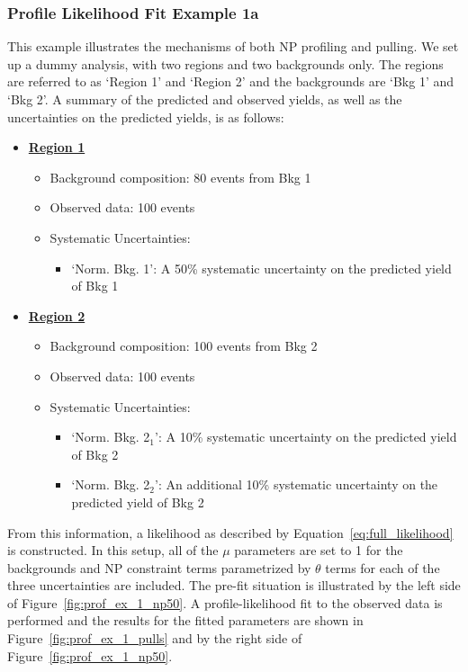 \subsubsection{Profile Likelihood Fit Example 1a}
\label{sec:profiling_example_1a}

This example illustrates the mechanisms of both NP profiling and pulling.
We set up a dummy analysis, with two regions and two backgrounds only.
The regions are referred to as `Region 1' and `Region 2' and the backgrounds
are `Bkg 1' and `Bkg 2'.
A summary of the predicted and observed yields, as well as the uncertainties on
the predicted yields, is as follows:

\begin{itemize}
    \item \underline{\textbf{Region 1}}
        \begin{itemize}
            \item Background composition: 80 events from Bkg 1
            \item Observed data: 100 events
            \item Systematic Uncertainties:
            \begin{itemize}
                \item `Norm. Bkg. 1': A 50\% systematic uncertainty on the predicted yield of Bkg 1
            \end{itemize}
        \end{itemize}
    \item \underline{\textbf{Region 2}}
        \begin{itemize}
            \item Background composition: 100 events from Bkg 2
            \item Observed data: 100 events
            \item Systematic Uncertainties:
            \begin{itemize}
                \item `Norm. Bkg. 2$_1$': A 10\% systematic uncertainty on the predicted yield of Bkg 2
                \item `Norm. Bkg. 2$_2$': An additional 10\% systematic uncertainty on the predicted yield of Bkg 2
            \end{itemize}
        \end{itemize}
\end{itemize}

From this information, a likelihood as described by Equation~\ref{eq:full_likelihood} is constructed.
In this setup, all of the $\mu$ parameters are set to 1 for the backgrounds
and NP constraint terms parametrized by $\theta$ terms
for each of the three uncertainties are included.
The pre-fit situation is illustrated by the left side of Figure~\ref{fig:prof_ex_1_np50}.
A profile-likelihood fit to the observed data is performed and the results for the fitted parameters
are shown in Figure~\ref{fig:prof_ex_1_pulls} and by the
right side of Figure~\ref{fig:prof_ex_1_np50}.

